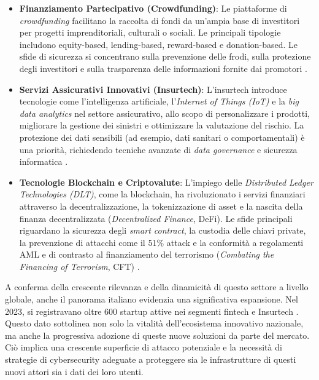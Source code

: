 \begin{itemize}
    \item \textbf{Finanziamento Partecipativo (Crowdfunding)}: Le piattaforme di \textit{crowdfunding} facilitano la raccolta di fondi da un'ampia base di investitori per progetti imprenditoriali, culturali o sociali. Le principali tipologie includono equity-based, lending-based, reward-based e donation-based. Le sfide di sicurezza si concentrano sulla prevenzione delle frodi, sulla protezione degli investitori e sulla trasparenza delle informazioni fornite dai promotori \cite{hornuf2018crowdfunding}.
    
    \item \textbf{Servizi Assicurativi Innovativi (Insurtech)}: L'insurtech introduce tecnologie come l'intelligenza artificiale, l'\textit{Internet of Things (IoT)} e la \textit{big data analytics} nel settore assicurativo, allo scopo di personalizzare i prodotti, migliorare la gestione dei sinistri e ottimizzare la valutazione del rischio. La protezione dei dati sensibili (ad esempio, dati sanitari o comportamentali) è una priorità, richiedendo tecniche avanzate di \textit{data governance} e sicurezza informatica \cite{eling2018insurtech}.
    
    \item \textbf{Tecnologie Blockchain e Criptovalute}: L'impiego delle \textit{Distributed Ledger Technologies (DLT)}, come la blockchain, ha rivoluzionato i servizi finanziari attraverso la decentralizzazione, la tokenizzazione di asset e la nascita della finanza decentralizzata (\textit{Decentralized Finance}, DeFi). Le sfide principali riguardano la sicurezza degli \textit{smart contract}, la custodia delle chiavi private, la prevenzione di attacchi come il 51\% attack e la conformità a regolamenti AML e di contrasto al finanziamento del terrorismo (\textit{Combating the Financing of Terrorism}, CFT) \cite{catalini2016blockchain}.
\end{itemize}

A conferma della crescente rilevanza e della dinamicità di questo settore a livello globale, anche il panorama italiano evidenzia una significativa espansione. Nel 2023, si registravano oltre 600 startup attive nei segmenti fintech e Insurtech \cite{fintech_numeri}. Questo dato sottolinea non solo la vitalità dell'ecosistema innovativo nazionale, ma anche la progressiva adozione di queste nuove soluzioni da parte del mercato. Ciò implica una crescente superficie di attacco potenziale e la necessità di strategie di cybersecurity adeguate a proteggere sia le infrastrutture di questi nuovi attori sia i dati dei loro utenti.

